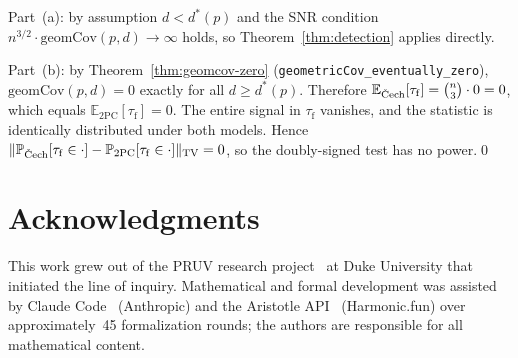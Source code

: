 \documentclass[reqno,12pt]{amsart}
\newcommand{\tauf}{\tau_{\mathrm{f}}}
\newcommand{\PC}{\mathrm{2PC}}
\newcommand{\Cech}{\ifmmode\text{\v{C}ech}\else\v{C}ech\fi}  %
\newcommand{\TV}{\mathrm{TV}}
\newcommand{\geomCov}{\mathrm{geomCov}}
\newcommand{\EE}{\mathbb{E}}
\newcommand{\PP}{\mathbb{P}}
\newcommand{\lean}[1]{\textup{\texttt{\small #1}}}
\theoremstyle{plain}
\theoremstyle{definition}
\theoremstyle{remark}
\begin{document}
Part~(a): by assumption $d < d^*(p)$ and the SNR condition $n^{3/2}\cdot\geomCov(p,d)\to\infty$
holds, so Theorem~\ref{thm:detection} applies directly.

Part~(b): by Theorem~\ref{thm:geomcov-zero} (\lean{geometricCov\_eventually\_zero}),
$\geomCov(p,d) = 0$ exactly for all $d \geq d^*(p)$.
Therefore $\EE_{\Cech}[\tauf] = \binom{n}{3}\cdot 0 = 0$, which equals $\EE_{\PC}[\tauf] = 0$.
The entire signal in $\tauf$ vanishes, and the statistic is identically distributed under both
models. Hence $\Vert\PP_{\Cech}[\tauf\in\cdot] - \PP_{\PC}[\tauf\in\cdot]\Vert_{\TV} = 0$,
so the doubly-signed test has no power.\qed

\section*{Acknowledgments}

This work grew out of the PRUV research project~\cite{Goh2023} at Duke University that
initiated the line of inquiry. Mathematical and formal development was assisted by Claude
Code~\cite{ClaudeCode2025} (Anthropic) and the Aristotle API~\cite{Aristotle2025}
(Harmonic.fun) over approximately~45 formalization rounds; the authors are responsible for
all mathematical content.



\end{document}
